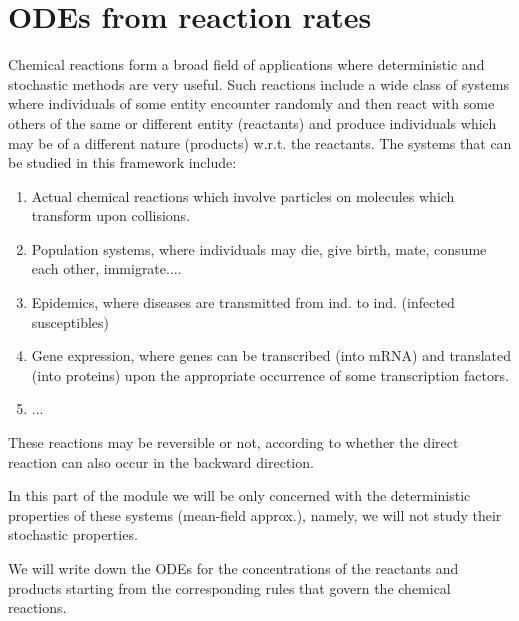 
\section{ODEs from reaction rates}
Chemical reactions form a broad field of applications where deterministic and
stochastic methods are very useful. Such reactions include a wide class of
systems where individuals of some entity encounter randomly and then react with
some others of the same or different entity (reactants) and produce individuals
which may be of a different nature (products) w.r.t. the reactants. The systems
that can be studied in this framework include:

\begin{enumerate}
    \item Actual chemical reactions which involve particles on molecules which
    transform upon collisions.
    \item Population systems, where individuals may die, give birth, mate,
    consume each other, immigrate....
    \item Epidemics, where diseases are transmitted from ind. to ind. (infected susceptibles)
    \item Gene expression, where genes can be transcribed (into mRNA) and
    translated (into proteins) upon the appropriate occurrence of some
    transcription factors.
    \item ...
\end{enumerate}

These reactions may be reversible or not, according to whether the direct
reaction can also occur in the backward direction.

In this part of the module we will be only concerned with the deterministic
properties of these systems (mean-field approx.), namely, we will not study
their stochastic properties.

We will write down the ODEs for the concentrations of the reactants and
products starting from the corresponding rules that govern the chemical
reactions.

